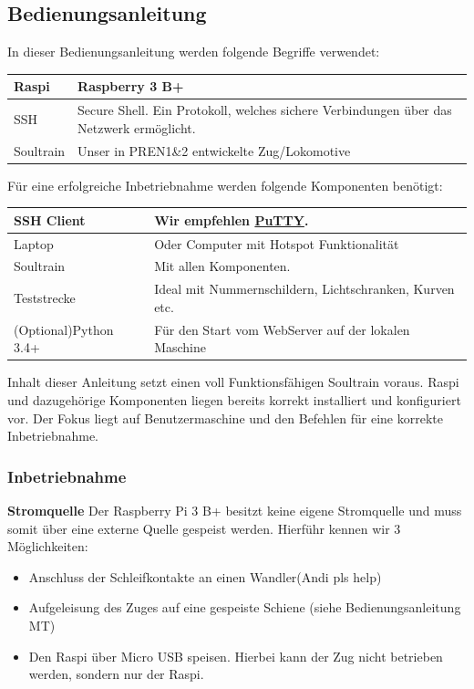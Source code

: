 \documentclass[../../main.tex]{subfiles}
\begin{document}
\subsection{Bedienungsanleitung}
In dieser Bedienungsanleitung werden folgende Begriffe verwendet:
\begin{table}[H]
    \begin{tabular}{ll}
    \hline
    Raspi & Raspberry 3 B+ \\ \hline
    SSH & Secure Shell. Ein Protokoll, welches sichere Verbindungen über das Netzwerk ermöglicht.\\ \hline
    Soultrain & Unser in PREN1\&2 entwickelte Zug/Lokomotive       \\ \hline
    \end{tabular}
\end{table}

Für eine erfolgreiche Inbetriebnahme werden folgende Komponenten benötigt:
\begin{table}[H]
    \begin{tabular}{ll}
    \hline
    SSH Client & Wir empfehlen \hyperref[https://www.putty.org/]{PuTTY}.\\ \hline
    Laptop & Oder Computer mit Hotspot Funktionalität\\ \hline
    Soultrain & Mit allen Komponenten.\\ \hline
    Teststrecke & Ideal mit Nummernschildern, Lichtschranken, Kurven etc.\\ \hline
    (Optional)Python 3.4+ & Für den Start vom WebServer auf der lokalen Maschine \\ \hline
    \end{tabular}
\end{table}

Inhalt dieser Anleitung setzt einen voll Funktionsfähigen Soultrain voraus. Raspi und dazugehörige Komponenten liegen bereits korrekt installiert und konfiguriert vor. Der Fokus liegt auf Benutzermaschine und den Befehlen für eine korrekte Inbetriebnahme.

\subsubsection{Inbetriebnahme}
\textbf{Stromquelle}
Der Raspberry Pi 3 B+ besitzt keine eigene Stromquelle und muss somit über eine externe Quelle gespeist werden. Hierführ kennen wir 3 Möglichkeiten:
\begin{itemize}
    \item Anschluss der Schleifkontakte an einen Wandler(Andi pls help)
    \item Aufgeleisung des Zuges auf eine gespeiste Schiene (siehe Bedienungsanleitung MT)
    \item Den Raspi über Micro USB speisen. Hierbei kann der Zug nicht betrieben werden, sondern nur der Raspi.
\end{itemize}
\end{document}
